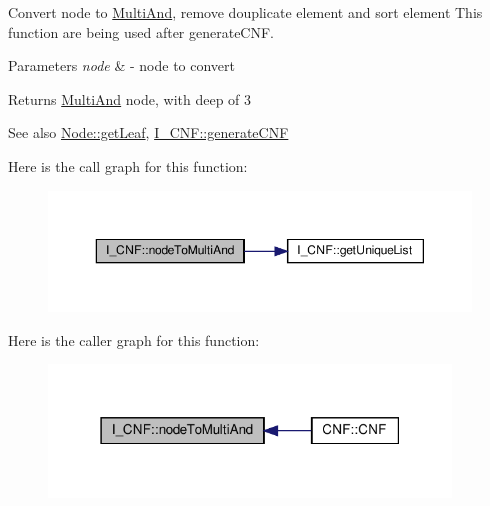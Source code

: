 Convert node to \hyperlink{class_multi_and}{Multi\+And}, remove douplicate element and sort element This function are being used after generate\+C\+NF. 


\begin{DoxyParams}{Parameters}
{\em node} & -\/ node to convert \\
\hline
\end{DoxyParams}
\begin{DoxyReturn}{Returns}
\hyperlink{class_multi_and}{Multi\+And} node, with deep of 3 
\end{DoxyReturn}
\begin{DoxySeeAlso}{See also}
\hyperlink{class_node_a73ccf66e577caa428163477f3b4cfe4d}{Node\+::get\+Leaf}, \hyperlink{struct_i___c_n_f_afedf64bb258fd48ea0f811a9f571f0f0}{I\+\_\+\+C\+N\+F\+::generate\+C\+NF} 
\end{DoxySeeAlso}
Here is the call graph for this function\+:\nopagebreak
\begin{figure}[H]
\begin{center}
\leavevmode
\includegraphics[width=350pt]{d5/d80/struct_i___c_n_f_ac0c5ce2bd3edadb60de923b4259cc10b_cgraph}
\end{center}
\end{figure}
Here is the caller graph for this function\+:\nopagebreak
\begin{figure}[H]
\begin{center}
\leavevmode
\includegraphics[width=303pt]{d5/d80/struct_i___c_n_f_ac0c5ce2bd3edadb60de923b4259cc10b_icgraph}
\end{center}
\end{figure}
\mbox{\label{struct_i___c_n_f_a1b3282ebd2d998f5fe3aa3e192346ac1}} 
